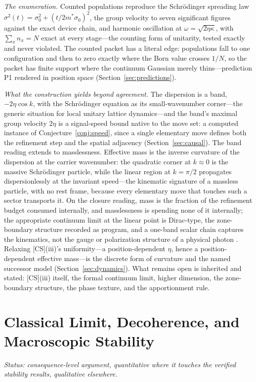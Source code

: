 \documentclass[11pt]{article}
\theoremstyle{definition}
\theoremstyle{remark}
\begin{document}
\emph{The enumeration.} Counted populations reproduce the Schr\"odinger spreading law $\sigma^2(t) = \sigma_0^2 + (t/2m^\ast\sigma_0)^2$, the group velocity to seven significant figures against the exact device chain, and harmonic oscillation at $\omega = \sqrt{2\eta\kappa}$, with $\sum_x n_x = N$ exact at every stage---the counting form of unitarity, tested exactly and never violated. The counted packet has a literal edge: populations fall to one configuration and then to zero exactly where the Born value crosses $1/N$, so the packet has finite support where the continuum Gaussian merely thins---prediction P1 rendered in position space (Section~\ref{sec:predictions}).

\emph{What the construction yields beyond agreement.} The dispersion is a band, $-2\eta\cos k$, with the Schr\"odinger equation as its small-wavenumber corner---the generic situation for local unitary lattice dynamics---and the band's maximal group velocity $2\eta$ is a signal-speed bound native to the move set: a computed instance of Conjecture~\ref{conj:speed}, since a single elementary move defines both the refinement step and the spatial adjacency (Section~\ref{sec:causal}). The band reading extends to masslessness. Effective mass is the inverse curvature of the dispersion at the carrier wavenumber: the quadratic corner at $k \approx 0$ is the massive Schr\"odinger particle, while the linear region at $k = \pi/2$ propagates dispersionlessly at the invariant speed---the kinematic signature of a massless particle, with no rest frame, because every elementary move that touches such a sector transports it. On the closure reading, mass is the fraction of the refinement budget consumed internally, and masslessness is spending none of it internally; the appropriate continuum limit at the linear point is Dirac-type, the zone-boundary structure recorded as program, and a one-band scalar chain captures the kinematics, not the gauge or polarization structure of a physical photon \cite{TillittSchr}. Relaxing [CS](iii)'s uniformity---a position-dependent $\eta$, hence a position-dependent effective mass---is the discrete form of curvature and the named successor model (Section~\ref{sec:dynamics}). What remains open is inherited and stated: [CS](iii) itself, the formal continuum limit, higher dimension, the zone-boundary structure, the phase texture, and the apportionment rule.

\section{Classical Limit, Decoherence, and Macroscopic Stability}\label{sec:classical}
\emph{Status: consequence-level argument, quantitative where it touches the verified stability results, qualitative elsewhere.}
\end{document}
